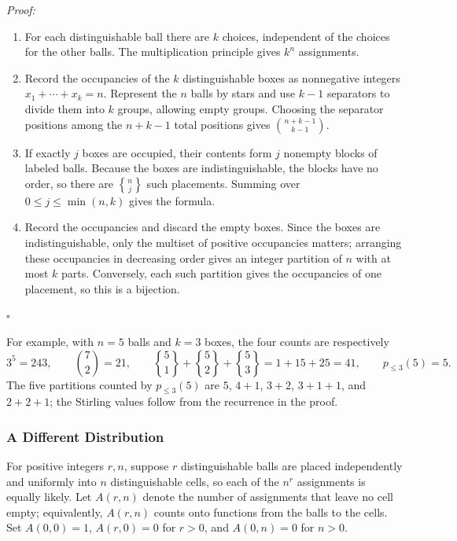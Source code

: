\documentclass[a4paper,11pt,abstracton]{scrartcl}
\newcommand{\genstirlingII}[3]{%
  \genfrac{\{}{\}}{0pt}{#1}{#2}{#3}%
}
\newcommand{\stirlingII}[2]{\genstirlingII{}{#1}{#2}}
\theoremstyle{dotlessP}
\theoremstyle{dotlessS}
\theoremstyle{remark}
\theoremstyle{definition}
\begin{document}
\begin{claim_box}
\textit{Proof:}
\begin{enumerate}
  \item For each distinguishable ball there are $k$ choices, independent of the choices for the other balls. The multiplication principle gives $k^n$ assignments.
  \item Record the occupancies of the $k$ distinguishable boxes as nonnegative integers $x_1+\cdots+x_k=n$. Represent the $n$ balls by stars and use $k-1$ separators to divide them into $k$ groups, allowing empty groups. Choosing the separator positions among the $n+k-1$ total positions gives $\binom{n+k-1}{k-1}$.
  \item If exactly $j$ boxes are occupied, their contents form $j$ nonempty blocks of labeled balls. Because the boxes are indistinguishable, the blocks have no order, so there are $\stirlingII{n}{j}$ such placements. Summing over $0\leq j\leq\min(n,k)$ gives the formula.
  \item Record the occupancies and discard the empty boxes. Since the boxes are indistinguishable, only the multiset of positive occupancies matters; arranging these occupancies in decreasing order gives an integer partition of $n$ with at most $k$ parts. Conversely, each such partition gives the occupancies of one placement, so this is a bijection.
\end{enumerate}
\hfill$\square$
\end{claim_box}

For example, with $n=5$ balls and $k=3$ boxes, the four counts are respectively
\[
  3^5=243,\qquad \binom{7}{2}=21,\qquad
  \stirlingII{5}{1}+\stirlingII{5}{2}+\stirlingII{5}{3}=1+15+25=41,
  \qquad p_{\leq 3}(5)=5.
\]
The five partitions counted by $p_{\leq 3}(5)$ are $5$, $4+1$, $3+2$, $3+1+1$, and $2+2+1$; the Stirling values follow from the recurrence in the proof.

\subsubsection{A Different Distribution}

For positive integers $r,n$, suppose $r$ distinguishable balls are placed independently and uniformly into $n$ distinguishable cells, so each of the $n^r$ assignments is equally likely. Let $A(r,n)$ denote the number of assignments that leave no cell empty; equivalently, $A(r,n)$ counts onto functions from the balls to the cells. Set $A(0,0)=1$, $A(r,0)=0$ for $r>0$, and $A(0,n)=0$ for $n>0$.
\end{document}
